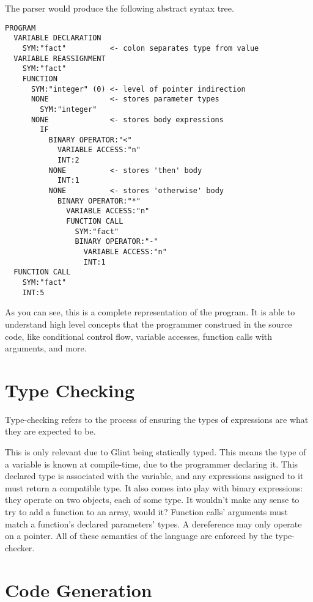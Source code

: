 \documentclass[
12pt,
letterpaper,
oneside,
]{memoir}
\newcommand{\lang}{Glint
}
\begin{document}
\filbreak

The parser would produce the following abstract syntax tree.

\begin{verbatim}
PROGRAM
  VARIABLE DECLARATION
    SYM:"fact"          <- colon separates type from value
  VARIABLE REASSIGNMENT
    SYM:"fact"
    FUNCTION
      SYM:"integer" (0) <- level of pointer indirection
      NONE              <- stores parameter types
        SYM:"integer"
      NONE              <- stores body expressions
        IF
          BINARY OPERATOR:"<"
            VARIABLE ACCESS:"n"
            INT:2
          NONE          <- stores 'then' body
            INT:1
          NONE          <- stores 'otherwise' body
            BINARY OPERATOR:"*"
              VARIABLE ACCESS:"n"
              FUNCTION CALL
                SYM:"fact"
                BINARY OPERATOR:"-"
                  VARIABLE ACCESS:"n"
                  INT:1
  FUNCTION CALL
    SYM:"fact"
    INT:5
\end{verbatim}

As you can see, this is a complete representation of the program. It is able to understand high level concepts that the programmer construed in the source code, like conditional control flow, variable accesses, function calls with arguments, and more.

\chapter{Type Checking}

Type-checking refers to the process of ensuring the types of expressions are what they are expected to be.

This is only relevant due to \lang being statically typed. This means the type of a variable is known at compile-time, due to the programmer declaring it. This declared type is associated with the variable, and any expressions assigned to it must return a compatible type. It also comes into play with binary expressions: they operate on two objects, each of some type. It wouldn't make any sense to try to add a function to an array, would it? Function calls' arguments must match a function's declared parameters' types. A dereference may only operate on a pointer. All of these semantics of the language are enforced by the type-checker.

\chapter{Code Generation}
\end{document}
